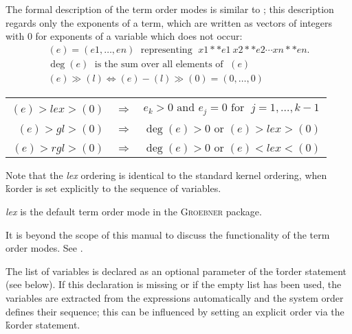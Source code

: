 The formal description of the term order modes is similar to
\cite{Kredel:88}; this description regards only the exponents of a term,
which are written as vectors of integers with $0$ for exponents of a
variable which does not occur:
\[
\begin{array}{l}
  (e) = (e1,\ldots , en) \;\mbox{ representing }\; x1**e1 \ x2**e2 \cdots
  xn**en. \\
  \deg(e) \; \mbox{ is the sum over all elements of } \;(e) \\
  (e) \gg (l) \Longleftrightarrow (e)-(l)\gg (0) = (0,\ldots ,0)
\end{array}
\]
\begin{center}
\begin{tabular}{@{}rll}
  \multicolumn{1}{l}{\hspace*{-.5cm}{\bf lex:}} \\
  $(e) > lex > (0)$ & $\Longrightarrow$ & $e_k > 0 \mbox{ and } e_j =0
  \mbox{ for }\; j=1,\ldots , k-1$ \\[2mm]
  \multicolumn{1}{l}{\hspace*{-.5cm}{\bf gradlex:}} \\
  $(e) >gl> (0)$    & $\Longrightarrow$ & $\deg(e)>0  \mbox { or } (e) >lex> (0)$ \\[2mm]
  \multicolumn{1}{l}{\hspace*{-.5cm}{\bf revgradlex:}} \\
  $(e) >rgl> (0)$   & $\Longrightarrow$ & $\deg(e)>0  \mbox{ or }(e)  <lex< (0)$
\end{tabular}
\end{center}

Note that the \emph{lex} ordering is identical to the standard \REDUCE
kernel ordering, when \f{korder} is set explicitly to the sequence of
variables.

\emph{lex} is the default term order mode in the \textsc{Groebner} package.

It is beyond the scope of this manual to discuss the functionality of
the term order modes. See \cite{Buchberger:88}.

The list of variables is declared as an optional parameter of the
\f{torder} statement (see below). If this declaration is missing
or if the empty list has been used, the variables are extracted from
the expressions automatically and the \REDUCE system order defines
their sequence; this can be influenced by setting an explicit order
via the \f{korder} statement.

